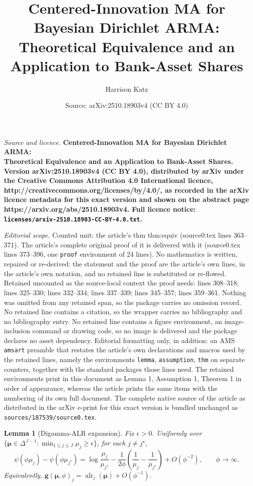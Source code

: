 \documentclass[10pt,a4paper]{amsart}
\title{\bf Centered-Innovation MA for Bayesian Dirichlet ARMA:\\ Theoretical Equivalence and an Application to Bank-Asset Shares}
\author{Harrison Katz}
\date{Source: arXiv:2510.18903v4 (CC BY 4.0)}
\newtheorem{lemma}{Lemma}
\newcommand{\alr}{\operatorname{alr}}
\newcommand{\bfmu}{\boldsymbol{\mu}}
\begin{document}
\maketitle

\noindent\emph{Source and licence.} \bf Centered-Innovation MA for Bayesian Dirichlet ARMA:\\ Theoretical Equivalence and an Application to Bank-Asset Shares. Version arXiv:2510.18903v4 (CC BY 4.0), distributed by arXiv under the Creative Commons Attribution 4.0 International licence, http://creativecommons.org/licenses/by/4.0/, as recorded in the arXiv licence metadata for this exact version and shown on the abstract page https://arxiv.org/abs/2510.18903v4. Full licence notice: \texttt{licenses/arxiv-2510.18903-CC-BY-4.0.txt}.\par\smallskip

\noindent\textit{Editorial scope.} Counted unit: the article's thm thm:equiv (source0.tex lines 363--371). The article's complete original proof of it is delivered with it (source0.tex lines 373--396, one \texttt{proof} environment of 24 lines). No mathematics is written, repaired or re-derived: the statement and the proof are the article's own lines, in the article's own notation, and no retained line is substituted or re-flowed.  Retained uncounted as the source-local context the proof needs: lines 308--318; lines 325--330; lines 332--334; lines 337--339; lines 345--357; lines 359--361.  Nothing was omitted from any retained span, so the package carries no omission record.  No retained line contains a citation, so the wrapper carries no bibliography and no bibliography entry.  No retained line contains a figure environment, an image-inclusion command or drawing code, so no image is delivered and the package declares no asset dependency.  Editorial formatting only, in addition: an AMS \texttt{amsart} preamble that restates the article's own declarations and macros used by the retained lines, namely the environments \texttt{lemma}, \texttt{assumption}, \texttt{thm} on separate counters, together with the standard packages those lines need.  The retained environments print in this document as Lemma 1, Assumption 1, Theorem 1 in order of appearance, whereas the article prints the same items with the numbering of its own full document.  The complete native source of the article as distributed in the arXiv e-print for this exact version is bundled unchanged as \texttt{sources/187539/source0.tex}.
\begin{lemma}[Digamma-ALR expansion]
\label{lem:expansion}
Fix $\epsilon>0$. Uniformly over $\{\bfmu\in\Delta^{J-1}:\min_{1\le j\le J}\mu_j\ge\epsilon\}$, for each $j\neq j^\star$,
\[
\psi(\phi\mu_j)-\psi(\phi\mu_{j^\star})
= \log\frac{\mu_j}{\mu_{j^\star}}
-\frac{1}{2\phi}\!\left(\frac{1}{\mu_j}-\frac{1}{\mu_{j^\star}}\right)
+ O(\phi^{-2}),\qquad \phi\to\infty.
\]
Equivalently, $\mathbf{g}(\bfmu,\phi)_j=\alr_j(\bfmu)+O(\phi^{-1})$.
\end{lemma}
\end{document}
